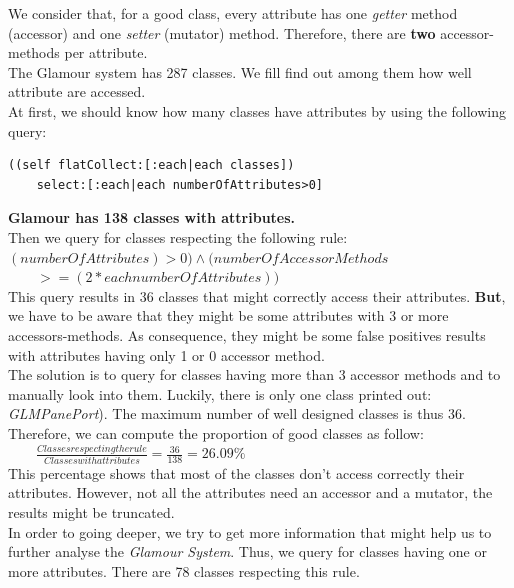 \documentclass[11pt,a4paper]{article}
\begin{document}
We consider that, for a good class, every attribute has one \textit{getter} method (accessor) and one \textit{setter} (mutator) method. Therefore, there are \textbf{two} accessor-methods per attribute.\\

The Glamour system has 287 classes. We fill find out among them how well attribute are accessed.\\

At first, we should know how many classes have attributes by using the following query:\\
\begin{lstlisting}
((self flatCollect:[:each|each classes])
	select:[:each|each numberOfAttributes>0]
\end{lstlisting}

\textbf{Glamour has 138 classes with attributes.}\\

Then we query for classes respecting the following rule:\\
$(numberOfAttributes) > 0) \land (numberOfAccessorMethods$\\ 
$\qquad >= (2*each numberOfAttributes))$\\


This query results in 36 classes that might correctly access their attributes. \textbf{But}, we have to be aware that they might be some attributes with 3 or more accessors-methods. As consequence, they might be some false positives results with attributes having only 1 or 0 accessor method.\\ 

The solution is to query for classes having more than 3 accessor methods and to manually look into them. Luckily, there is only one class printed out:  \textit{GLMPanePort}). The maximum number of well designed classes is thus 36.\\

Therefore, we can compute the proportion of good classes as follow:\\
 $\qquad \frac{Classes respecting the rule}{Classes with attributes} = \frac{36}{138} = 26.09\%$\\

This percentage shows that most of the classes don't access correctly their attributes. However, not all the attributes need an accessor and a mutator, the results might be truncated.\\ 

In order to going deeper, we try to get more information that might help us to further analyse the \textit{Glamour System}. Thus, we query for classes having one or more attributes. There are 78 classes respecting this rule.\\
\end{document}
